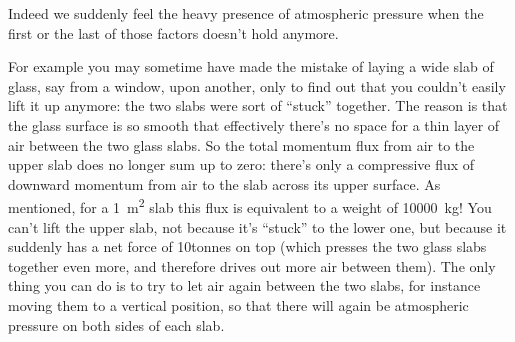 \documentclass[a4paper,12pt,%
onecolumn,oneside,%
british%
]{memoir}
\renewcommand*{\|}[1][]{\nonscript\:#1\vert\nonscript\:\mathopen{}}
\begin{document}
Indeed we suddenly feel the heavy presence of atmospheric pressure when the first or the last of those factors doesn't hold anymore.

For example you may sometime have made the mistake of laying a wide slab of glass, say from a window, upon another, only to find out that you couldn't easily lift it up anymore: the two slabs were sort of \enquote{stuck} together.
%
%
The reason is that the glass surface is so smooth that effectively there's no space for a thin layer of air between the two glass slabs. So the total momentum flux from air to the upper slab does no longer sum up to zero: there's only a compressive flux of downward momentum from air to the slab across its upper surface. As mentioned, for a \qty{1}{m^2} slab this flux is equivalent to a weight of \qty{10000}{kg}! You can't lift the upper slab, not because it's \enquote{stuck} to the lower one, but because it suddenly has a net force of 10\:tonnes on top (which presses the two glass slabs together even more, and therefore drives out more air between them). The only thing you can do is to try to let air again between the two slabs, for instance moving them to a vertical position, so that there will again be atmospheric pressure on both sides of each slab.
\end{document}
